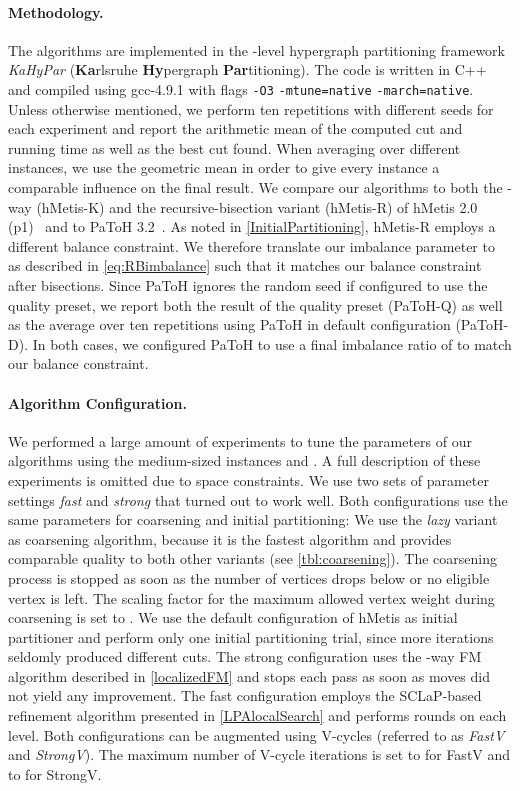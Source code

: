 \documentclass[runningheads,a4paper]{llncs}
\begin{document}
\paragraph{Methodology.}  \label{Methodology}
The algorithms are implemented in the -level hypergraph partitioning framework \emph{KaHyPar} (\textbf{Ka}rlsruhe \textbf{Hy}pergraph \textbf{Par}titioning). The code is written in C++ and compiled using gcc-4.9.1 with flags \texttt{-O3} \texttt{-mtune=native} \texttt{-march=native}. 
Unless otherwise mentioned, we perform ten repetitions with different seeds for each experiment and report the arithmetic 
mean of the computed cut and running time as well as the best cut found. When averaging over different instances, we use the 
geometric mean in order to give every instance a comparable influence on the final result. 
We compare our algorithms to both the -way (hMetis-K) and the recursive-bisection variant (hMetis-R) of hMetis 2.0 (p1)~\cite{hMetisRB,hMetisKway} and to PaToH 3.2~\cite{PaToH}. 
As noted in \autoref{InitialPartitioning}, hMetis-R employs a different balance constraint. We therefore translate our
imbalance parameter  to  as described in \autoref{eq:RBimbalance} such that it matches our balance constraint after  
bisections.  
Since PaToH ignores the random seed if configured to use the quality preset, we report both the result of the quality preset (PaToH-Q) as well as the
average over ten repetitions using PaToH in default configuration (PaToH-D). In both cases, we configured PaToH to use a final imbalance ratio of  to
match our balance constraint.

\paragraph{Algorithm Configuration.}  \label{AlgorithmConfiguration}
We performed a large amount of experiments to tune the parameters of our algorithms using the medium-sized instances and . 
A full description of these experiments is omitted due to space constraints. We use two sets of parameter settings \emph{fast} and \emph{strong} that turned out to work well. Both configurations use the same parameters for coarsening and initial partitioning:  We use the \emph{lazy} variant 
as coarsening algorithm, because it is the fastest algorithm and provides comparable quality to both other variants (see \autoref{tbl:coarsening}).
The coarsening process is stopped as soon as the number of vertices drops below  or no eligible vertex is left. 
The scaling factor  for the maximum allowed vertex weight during coarsening is set to . We use the default configuration of hMetis as initial partitioner and perform only one initial partitioning trial, since more iterations seldomly produced different cuts.
The strong configuration uses the -way FM algorithm described in \autoref{localizedFM} and stops each pass as soon as  moves did not yield any improvement.
The fast configuration employs the SCLaP-based refinement algorithm presented in \autoref{LPAlocalSearch} and performs  rounds on each level. 
Both configurations can be augmented using V-cycles (referred to as \emph{FastV} and \emph{StrongV}). 
The maximum number of V-cycle iterations is set to  for FastV and to  for StrongV.
\end{document}
